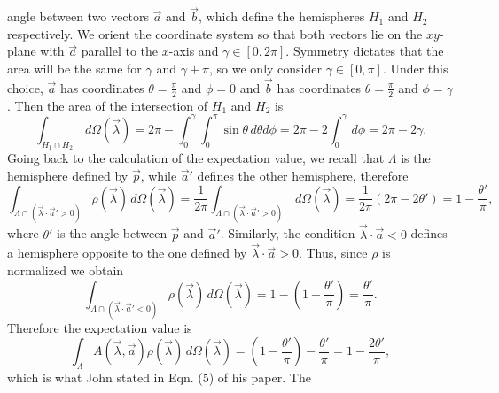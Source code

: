 \documentclass[a4paper]{article}
\begin{document}
    angle between two vectors $\vec a$ and $\vec b$, which
    define the hemispheres $H_1$ and $H_2$ respectively.  We
    orient the coordinate system so that both vectors lie on
    the $xy$-plane with $\vec a$ parallel to the $x$-axis
    and $\gamma \in [0,2\pi]$.  Symmetry dictates that the
    area will be the same for $\gamma$ and $\gamma + \pi$,
    so we only consider $\gamma \in [0,\pi]$. Under this
    choice, $\vec a$ has coordinates $\theta =
    \frac{\pi}{2}$ and $\phi = 0$ and $\vec b$ has
    coordinates $\theta = \frac{\pi}{2}$ and $\phi =
    \gamma$. Then the area of the intersection of $H_1$ and
    $H_2$ is
    \begin{equation}
        \int_{H_1 \cap H_2} \, d\Omega(\vec \lambda)
        = 2\pi - \int_{0}^{\gamma}\int_{0}^{\pi}
        \sin\theta \, d\theta d\phi
        = 2\pi - 2 \int_{0}^{\gamma} \, d\phi
        = 2\pi - 2\gamma.
    \end{equation}
    Going back to the calculation of the expectation value,
    we recall that $\Lambda$ is the hemisphere defined by
    $\vec p$, while $\vec a'$ defines the other hemisphere,
    therefore
    \begin{equation}
        \int_{\Lambda \cap (\vec \lambda \cdot \vec a' > 0)}
        \rho(\vec \lambda) \, d\Omega(\vec \lambda)
        = \frac{1}{2\pi} \int_{\Lambda \cap (\vec \lambda
        \cdot \vec a' > 0)} \,
        d\Omega(\vec \lambda)
        = \frac{1}{2\pi} \left( 2\pi - 2\theta' \right) 
        = 1 - \frac{\theta'}{\pi},
    \end{equation}
    where $\theta'$ is the angle between $\vec p$ and $\vec
    a'$. Similarly, the condition $\vec \lambda \cdot \vec a
    < 0$ defines a hemisphere opposite to the one defined by
    $\vec \lambda \cdot \vec a > 0$. Thus, since $\rho$ is
    normalized we obtain
    \begin{equation}
        \int_{\Lambda \cap (\vec \lambda \cdot \vec a' < 0)}
        \rho(\vec \lambda) \, d\Omega(\vec \lambda)
        = 1 - \left(1 - \frac{\theta'}{\pi}\right)
        = \frac{\theta'}{\pi}.
    \end{equation}
    Therefore the expectation value is
    \begin{equation}
        \int_{\Lambda} A(\vec \lambda, \vec a) \rho(\vec
        \lambda) \, d\Omega(\vec \lambda)
        = \left(1 - \frac{\theta'}{\pi}\right) -
        \frac{\theta'}{\pi} 
        = 1 - \frac{2\theta'}{\pi},
    \end{equation}
    which is what John stated in Eqn. (5) of his paper. The
\end{document}
